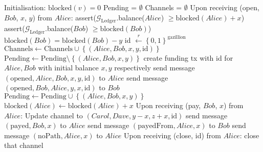 \begin{algorithm}
  \caption{$\mathcal{F}_{\mathrm{PayNet}}$}
  \label{alg:payfunc}
  \begin{algorithmic}[1]
    \State Initialisation:
      \State $\mathrm{blocked}\left(v\right) = 0$
    \EndFor
    \State Pending = $\emptyset$
    \State Channels = $\emptyset$
    \State
    \State Upon receiving (open, $Bob$, $x$, $y$) from $Alice$:
        \State assert($\mathcal{G}_{\mathrm{Ledger}}$.balance($Alice$) $\geq
        \mathrm{blocked}\left(Alice\right) + x$)
        \State assert($\mathcal{G}_{\mathrm{Ledger}}$.balance($Bob$) $\geq
        \mathrm{blocked}\left(Bob\right)$)
        \State $\mathrm{blocked}\left(Bob\right) = \mathrm{blocked}\left(Bob\right) - y$
        \State id $\overset{r}{\leftarrow} \left\{0, 1\right\}^{\mathrm{gazillion}}$
        \State $\mathrm{Channels} \leftarrow \mathrm{Channels} \cup \left\{\left(Alice,
        Bob, x, y, \mathrm{id}\right)\right\}$
        \State $\mathrm{Pending} \leftarrow \mathrm{Pending} \setminus \left\{\left(Alice,
        Bob, x, y\right)\right\}$
        \State create funding tx with id for $Alice, Bob$ with initial balance $x, y$
        respectively
        \State send message $\left(\mathrm{opened}, Alice, Bob, x, y, \mathrm{id}\right)$
        to $Alice$
        \State send message $\left(\mathrm{opened}, Bob, Alice, y, x, \mathrm{id}\right)$
        to $Bob$
      \Else
        \State $\mathrm{Pending} \leftarrow \mathrm{Pending} \cup \left\{\left(Alice, Bob,
        x, y\right)\right\}$
        \State $\mathrm{blocked}\left(Alice\right) \leftarrow
        \mathrm{blocked}\left(Alice\right) + x$
      \EndIf
    \State
    \State Upon receiving (pay, $Bob$, $x$) from $Alice$:
          \State Update channel to $\left(Carol, Dave, y - x, z + x, \mathrm{id}\right)$
        \EndFor
        \State send message $\left(\mathrm{payed}, Bob, x\right)$ to $Alice$
        \State send message $\left(\mathrm{payedFrom}, Alice, x\right)$ to $Bob$
      \Else
        \State send message $\left(\mathrm{noPath}, Alice, x\right)$ to $Alice$
      \EndIf
    \State
    \State Upon receiving (close, id) from $Alice$:
        close that channel
      \EndIf
  \end{algorithmic}
\end{algorithm}
